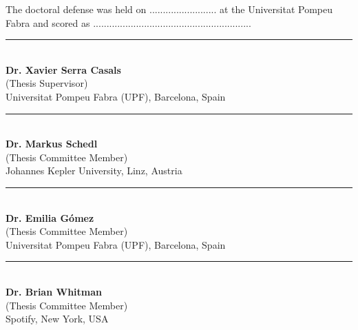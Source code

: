 \newcommand\advisor[2]{
	\vspace{1.3cm}
	\begin{center}
		\rule{6cm}{0.8pt}\\
		\textbf{#1}\\
		(Thesis Supervisor)\\
		#2
	\end{center}
}
\newcommand\member[2]{
	\vspace{1.3cm}
	\begin{center}
		\rule{6cm}{0.8pt}\\
		\textbf{#1}\\
		(Thesis Committee Member) \\
		#2
	\end{center}
} 

\vspace{1cm}
\noindent The doctoral defense was held on ......................... at the Universitat Pompeu Fabra and scored as ...........................................................\par
\vspace{2cm}
\advisor{Dr. Xavier Serra Casals}{Universitat Pompeu Fabra (UPF), Barcelona, Spain}
\vspace*{0.3cm}

\member{Dr. Markus Schedl}{Johannes Kepler University, Linz, Austria}
\member{Dr. Emilia G{\'o}mez}{Universitat Pompeu Fabra (UPF), Barcelona, Spain}
\member{Dr. Brian Whitman}{Spotify, New York, USA}